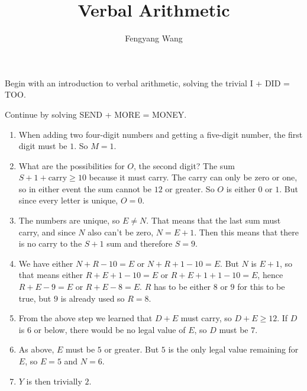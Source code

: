\documentclass[letterpaper,10pt]{article}
\title{Verbal Arithmetic}
\author{Fengyang Wang}
\begin{document}
\maketitle

Begin with an introduction to verbal arithmetic, solving the
trivial I + DID = TOO.

Continue by solving SEND + MORE = MONEY.

\begin{enumerate}
 \item When adding two four-digit numbers and
 getting a five-digit number, the first digit must be $1$.
 So $M=1$.
 \item What are the possibilities for $O$, the second digit?
 The sum $S+1+\text{carry} \ge 10$ because it must carry.
 The carry can only be zero or one, so in either event the
 sum cannot be $12$ or greater. So $O$ is either $0$ or $1$.
 But since every letter is unique, $O=0$.
 \item The numbers are unique, so $E \ne N$. That means that
 the last sum must carry, and since $N$ also can't be zero,
 $N = E + 1$. Then this means that there is no carry to the
 $S+1$ sum and therefore $S = 9$.
 \item We have either $N+R-10=E$ or $N+R+1-10=E$. But $N$ is
 $E+1$, so that means either $R+E+1-10=E$ or $R+E+1+1-10=E$,
 hence $R+E-9=E$ or $R+E-8=E$. $R$ has to be either $8$ or $9$
 for this to be true, but $9$ is already used so $R=8$.
 \item From the above step we learned that $D+E$ must carry,
 so $D+E \ge 12$. If $D$ is $6$ or below, there would be no legal
 value of $E$, so $D$ must be $7$.
 \item As above, $E$ must be $5$ or greater. But $5$ is the only
 legal value remaining for $E$, so $E=5$ and $N=6$.
 \item $Y$ is then trivially $2$.
\end{enumerate}
\end{document}
